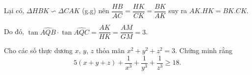 \begin{ex}
{\begin{enumerate}
			Lại có, $\Delta HBK\backsim \Delta CAK$ (g.g) nên $\dfrac{HB}{AC}=\dfrac{HK}{CK}=\dfrac{BK}{AK}$ suy ra $AK.HK=BK.CK$.
			
			Do đó, $\tan\widehat{AQB}\cdot\tan\widehat{AQC}=\dfrac{AK}{HK}=\dfrac{AM}{GM}=3$.
	\end{enumerate}}
\end{ex}

\begin{ex}%
    Cho các số thực dương $x$, $y$, $z$ thỏa mãn $x^2+y^2+z^2=3$. Chứng minh rằng $$5(x+y+z)+\dfrac{1}{x^3}+\dfrac{1}{y^3}+\dfrac{1}{z^3}\geq 18.$$
\end{ex}

